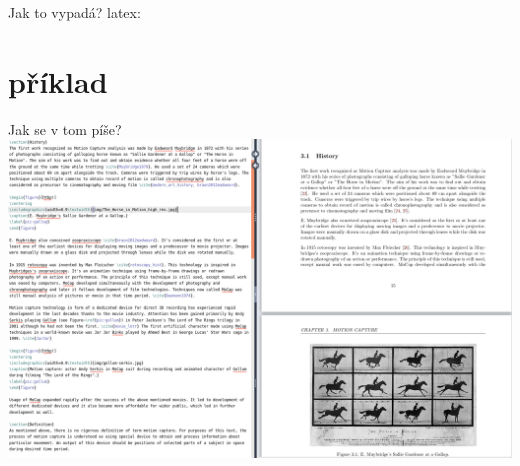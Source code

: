 \documentclass{beamer}
\begin{document}
\begin{frame}{Jak to vypadá?}
latex:
\end{frame}{}

\section{příklad}
\begin{frame}{Jak se v tom píše?}
\includegraphics[width=\textwidth]{latex.png}
\end{frame}
\end{document}
